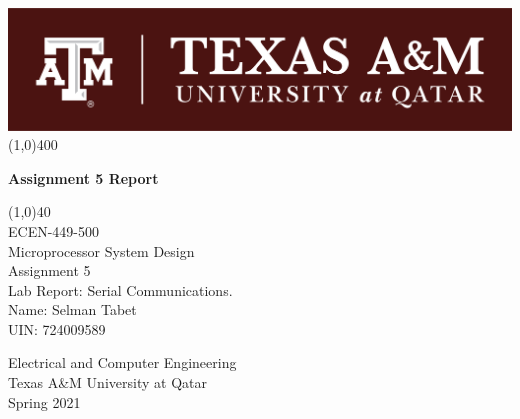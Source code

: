 \begin{titlepage}
\begin{center}
\includegraphics[scale=1.5]{Figures/TAMUQ.png}
\line(1,0){400}\\
[2mm]
\begin{huge}
\textbf{Assignment 5 Report}\\ 
\end{huge}
\begin{LARGE}
\line(1,0){40}\\
[1.5cm]
ECEN-449-500\\
Microprocessor System Design\\
[3cm]
Assignment 5\\
Lab Report: Serial Communications.\\ 
[2.5cm]
Name: Selman Tabet\\
UIN: 724009589\\
[4cm]
\end{LARGE}
\begin{large}
Electrical and Computer Engineering\\
Texas A&M University at Qatar\\
Spring 2021
\end{large}
\end{center} 
\end{titlepage}